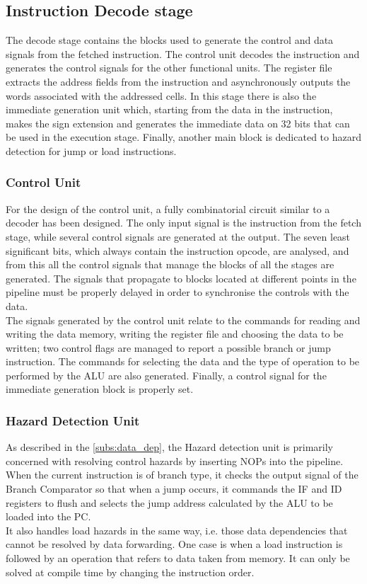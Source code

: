 \subsection{Instruction Decode stage}
The decode stage contains the blocks used to generate the control and data signals from the fetched instruction. The control unit decodes the instruction and generates the control signals for the other functional units. The register file extracts the address fields from the instruction and asynchronously outputs the words associated with the addressed cells. In this stage there is also the immediate generation unit which, starting from the data in the instruction, makes the sign extension and generates the immediate data on 32 bits that can be used in the execution stage. Finally, another main block is dedicated to hazard detection for jump or load instructions.

\subsubsection{Control Unit}
For the design of the control unit, a fully combinatorial circuit similar to a decoder has been designed. The only input signal is the instruction from the fetch stage, while several control signals are generated at the output. The seven least significant bits, which always contain the instruction opcode, are analysed, and from this all the control signals that manage the blocks of all the stages are generated. The signals that propagate to blocks located at different points in the pipeline must be properly delayed in order to synchronise the controls with the data.\\
The signals generated by the control unit relate to the commands for reading and writing the data memory, writing the register file and choosing the data to be written; two control flags are managed to report a possible branch or jump instruction. The commands for selecting the data and the type of operation to be performed by the ALU are also generated. Finally, a control signal for the immediate generation block is properly set.


\subsubsection{Hazard Detection Unit}
As described in the \autoref{subs:data_dep}, the Hazard detection unit is primarily concerned with resolving control hazards by inserting NOPs into the pipeline.
When the current instruction is of branch type, it checks the output signal of the Branch Comparator so that when a jump occurs, it commands the IF and ID registers to flush and selects the jump address calculated by the ALU to be loaded into the PC.\\
It also handles load hazards in the same way, i.e. those data dependencies that cannot be resolved by data forwarding. One case is when a load instruction is followed by an operation that refers to data taken from memory. It can only be solved at compile time by changing the instruction order.

